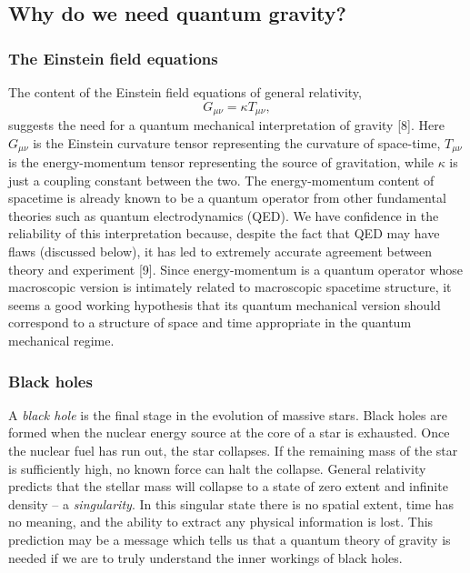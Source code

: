 \subsection{Why do we need quantum gravity?}

\subsubsection{The Einstein field equations}

The content of the Einstein field equations of general relativity, 
\begin{equation}
G_{\mu \nu }=\kappa T_{\mu \nu },  \label{2}
\end{equation}
suggests the need for a quantum mechanical interpretation of gravity [8].
Here $G_{\mu \nu }$ is the Einstein curvature tensor representing the
curvature of space-time, $T_{\mu \nu }$ is the energy-momentum tensor
representing the source of gravitation, while $\kappa $ is just a coupling
constant between the two. The energy-momentum content of spacetime is
already known to be a quantum operator from other fundamental theories such
as quantum electrodynamics (QED). We have confidence in the reliability of
this interpretation because, despite the fact that QED may have flaws
(discussed below), it has led to extremely accurate agreement between theory
and experiment [9]. Since energy-momentum is a quantum operator whose
macroscopic version is intimately related to macroscopic spacetime
structure, it seems a good working hypothesis that its quantum mechanical
version should correspond to a structure of space and time appropriate in
the quantum mechanical regime.

\subsubsection{Black holes}

A {\it black hole} is the final stage in the evolution of massive stars.
Black holes are formed when the nuclear energy source at the core of a star
is exhausted. Once the nuclear fuel has run out, the star collapses. If the
remaining mass of the star is sufficiently high, no known force can halt the
collapse. General relativity predicts that the stellar mass will collapse to
a state of zero extent and infinite density -- a {\it singularity}. In this
singular state there is no spatial extent, time has no meaning, and the
ability to extract any physical information is lost. This prediction may be
a message which tells us that a quantum theory of gravity is needed if we
are to truly understand the inner workings of black holes.

